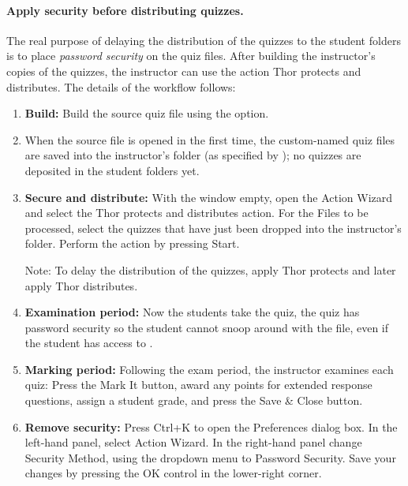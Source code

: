 \documentclass{article}
\def\FmtMP#1{\marginpar{\small\itshape\raggedleft#1}}
\begin{document}
\paragraph*{Apply security before distributing quizzes.} The real purpose of
delaying the distribution of the quizzes to the student folders is to place
\emph{password security} on the quiz files. After building the instructor's
copies of the quizzes, the instructor can use the action \textsf{Thor
protects and distributes}. The details of the workflow follows:
\begin{enumerate}
\item \textbf{Build:} Build the source quiz file using the  option.

\item[] When the source file is opened in  the first time, the
    custom-named quiz files are saved into the instructor's folder (as
    specified by ); no quizzes are deposited in the student
    folders yet.

\item \textbf{Secure and distribute:} With the  window empty,
    open the \textsf{Action Wizard} and select the \FmtMP{{Action: }\textsf{Thor
    protects and distributes}}\textsf{Thor protects and distributes} action.
    For the \textsf{Files to be processed}, select the quizzes that have
    just been dropped into the instructor's folder. Perform the action by
    pressing \textsf{Start}.

    Note: To delay the distribution of the quizzes, apply
    \textsf{Thor protects} and later apply \textsf{Thor distributes}.

\item \textbf{Examination period:} Now the students take the quiz, the quiz
    has password security so the student cannot snoop around with the file,
    even if the student has access to .

\item \textbf{Marking period:} Following the exam period, the instructor
    examines each quiz: Press the \textsf{Mark It} button, award any points
    for extended response questions, assign a student grade, and press the
    \textsf{Save \& Close} button.

\item \textbf{Remove security:}\label{item:RS} Press \textsf{Ctrl+K} to
    open the \textsf{Preferences} dialog box. In the left-hand panel,
    select \textsf{Action Wizard}. In the right-hand panel change
    \textsf{Security Method}, using the dropdown menu to \textsf{Password
    Security}. Save your changes by pressing the \textsf{OK} control in the
    lower-right corner.


\end{enumerate}
\end{document}
